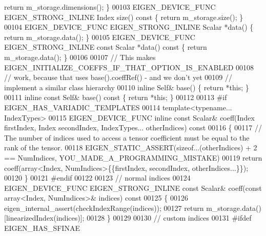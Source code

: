 \begin{DoxyCode}
{      return} m\_storage.dimensions(); \}
00103     EIGEN\_DEVICE\_FUNC EIGEN\_STRONG\_INLINE Index                         size()\textcolor{keyword}{                   const }\{ \textcolor{keywordflow}{
      return} m\_storage.size(); \}
00104     EIGEN\_DEVICE\_FUNC EIGEN\_STRONG\_INLINE Scalar                        *data()                        \{ \textcolor{keywordflow}{
      return} m\_storage.data(); \}
00105     EIGEN\_DEVICE\_FUNC EIGEN\_STRONG\_INLINE \textcolor{keyword}{const} Scalar                  *data()\textcolor{keyword}{                  const }\{ \textcolor{keywordflow}{
      return} m\_storage.data(); \}
00106 
00107     \textcolor{comment}{// This makes EIGEN\_INITIALIZE\_COEFFS\_IF\_THAT\_OPTION\_IS\_ENABLED}
00108     \textcolor{comment}{// work, because that uses base().coeffRef() - and we don't yet}
00109     \textcolor{comment}{// implement a similar class hierarchy}
00110     \textcolor{keyword}{inline} Self& base()             \{ \textcolor{keywordflow}{return} *\textcolor{keyword}{this}; \}
00111     \textcolor{keyword}{inline} \textcolor{keyword}{const} Self& base()\textcolor{keyword}{ const }\{ \textcolor{keywordflow}{return} *\textcolor{keyword}{this}; \}
00112 
00113 \textcolor{preprocessor}{#if EIGEN\_HAS\_VARIADIC\_TEMPLATES}
00114     \textcolor{keyword}{template}<\textcolor{keyword}{typename}... IndexTypes>
00115     EIGEN\_DEVICE\_FUNC \textcolor{keyword}{inline} \textcolor{keyword}{const} Scalar& coeff(Index firstIndex, Index secondIndex, IndexTypes... 
      otherIndices)\textcolor{keyword}{ const}
00116 \textcolor{keyword}{    }\{
00117       \textcolor{comment}{// The number of indices used to access a tensor coefficient must be equal to the rank of the tensor.}
00118       EIGEN\_STATIC\_ASSERT(\textcolor{keyword}{sizeof}...(otherIndices) + 2 == NumIndices, YOU\_MADE\_A\_PROGRAMMING\_MISTAKE)
00119       \textcolor{keywordflow}{return} coeff(array<Index, NumIndices>\{\{firstIndex, secondIndex, otherIndices...\}\});
00120     \}
00121 \textcolor{preprocessor}{#endif}
00122 
00123     \textcolor{comment}{// normal indices}
00124     EIGEN\_DEVICE\_FUNC EIGEN\_STRONG\_INLINE \textcolor{keyword}{const} Scalar& coeff(\textcolor{keyword}{const} array<Index, NumIndices>& indices)\textcolor{keyword}{
       const}
00125 \textcolor{keyword}{    }\{
00126       eigen\_internal\_assert(checkIndexRange(indices));
00127       \textcolor{keywordflow}{return} m\_storage.data()[linearizedIndex(indices)];
00128     \}
00129 
00130     \textcolor{comment}{// custom indices}
00131 \textcolor{preprocessor}{#ifdef EIGEN\_HAS\_SFINAE}

\end{DoxyCode}
